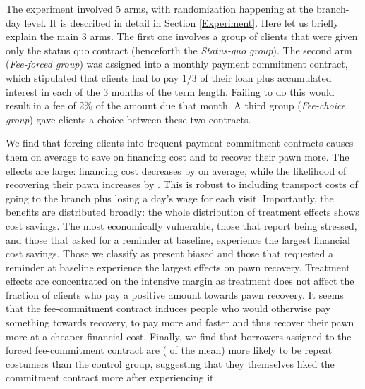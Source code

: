 \documentclass[11pt]{article}
\begin{document}
The experiment involved 5 arms, with randomization happening at the branch-day level. It is described in detail in Section \ref{Experiment}. Here let us briefly explain the main 3 arms. The first one involves a group of clients that were given only the status quo contract (henceforth the \textit{Status-quo group}). The second arm (\textit{Fee-forced group}) was assigned into a monthly payment commitment contract, which stipulated that clients had to pay 1/3 of their loan plus accumulated interest in each of the 3 months of the term length. Failing to do this would result in a fee of 2\% of the amount due that month. A third group (\textit{Fee-choice group}) gave clients a choice between these two contracts.

We find that forcing clients into frequent payment commitment contracts causes them on average to save on financing cost and to recover their pawn more. The effects are large: financing cost decreases by  on average, while the likelihood of recovering their pawn increases by . This is robust to including  transport costs of going to the branch plus losing a day's wage for each visit. Importantly, the benefits are distributed broadly: the whole distribution of treatment effects shows cost savings. The most economically vulnerable, those that report being stressed, and those that asked for a reminder at baseline, experience the largest financial cost savings. Those we classify as present biased and those that requested a reminder at baseline experience the largest effects on pawn recovery. %
Treatment effects are concentrated on the intensive margin as treatment does not affect the fraction of clients who pay a positive amount towards pawn recovery. It seems that the fee-commitment contract induces people who would otherwise pay something towards recovery, to pay more and faster and thus recover their pawn more at a cheaper financial cost. Finally, we find that borrowers assigned to the forced fee-commitment contract are  ( of the mean) more likely to be repeat costumers than the control group, suggesting that they themselves liked the commitment contract more after experiencing it.

\end{document}
